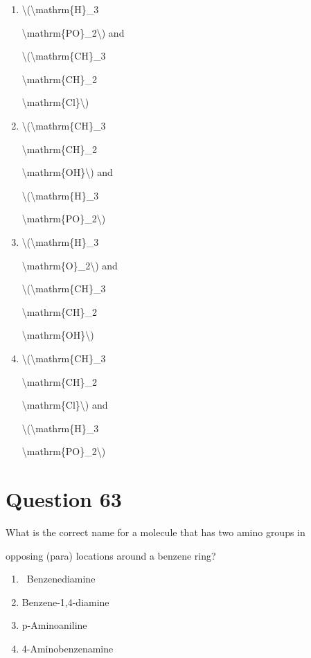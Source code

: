 \documentclass{article}
\begin{document}
\begin{enumerate}[label=(\alph*)]
\item \textbackslash(\textbackslash mathrm\{H\}\_3

\textbackslash mathrm\{PO\}\_2\textbackslash) and

\textbackslash(\textbackslash mathrm\{CH\}\_3

\textbackslash mathrm\{CH\}\_2

\textbackslash mathrm\{Cl\}\textbackslash)


\item \textbackslash(\textbackslash mathrm\{CH\}\_3

\textbackslash mathrm\{CH\}\_2

\textbackslash mathrm\{OH\}\textbackslash) and

\textbackslash(\textbackslash mathrm\{H\}\_3

\textbackslash mathrm\{PO\}\_2\textbackslash)


\item \textbackslash(\textbackslash mathrm\{H\}\_3

\textbackslash mathrm\{O\}\_2\textbackslash) and

\textbackslash(\textbackslash mathrm\{CH\}\_3

\textbackslash mathrm\{CH\}\_2

\textbackslash mathrm\{OH\}\textbackslash)


\item \textbackslash(\textbackslash mathrm\{CH\}\_3

\textbackslash mathrm\{CH\}\_2

\textbackslash mathrm\{Cl\}\textbackslash) and

\textbackslash(\textbackslash mathrm\{H\}\_3

\textbackslash mathrm\{PO\}\_2\textbackslash)


\end{enumerate}
\newpage
\section*{Question 63}
{What is the correct name for a molecule that has two amino groups in

opposing (para) locations around a benzene ring?}


\begin{enumerate}[label=(\alph*)]
\item {~Benzenediamine}


\item {Benzene-1,4-diamine}


\item {p-Aminoaniline}


\item {4-Aminobenzenamine}


\end{enumerate}
\newpage
\end{document}
